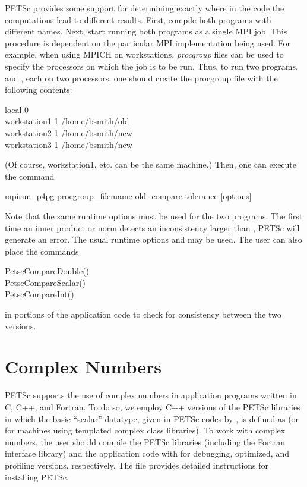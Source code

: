 {{{PETSc provides some support for determining exactly where in the code
the computations lead to different results. First, compile both programs
with different names.  Next, start running
both programs as a single MPI job. This procedure is dependent on the particular
MPI implementation being used.
For example, when using MPICH on workstations, 
{\em procgroup} files can be used to specify the processors on which the job is
to be run.  Thus, to run two programs,  and ,
each on two processors, one should create the procgroup file with the
following contents:
\begin{tabbing}
   local 0\\
   workstation1 1 /home/bsmith/old\\
   workstation2 1 /home/bsmith/new\\
   workstation3 1 /home/bsmith/new\\
\end{tabbing}
(Of course, workstation1, etc. can be the same machine.) Then, one can
execute the command
\begin{tabbing}
   mpirun -p4pg \trl{<}procgroup\_filemame\trl{>} old -compare \trl{<}tolerance\trl{>} [options]
\end{tabbing}
Note that the same runtime options must be used for the two programs.
The first time an inner product or norm detects an inconsistency larger
than , PETSc will generate an error. The usual runtime
options  and  may 
be used.   The user can also place the commands 
\begin{tabbing}
   PetscCompareDouble()\\
   PetscCompareScalar()\\
   PetscCompareInt()
\end{tabbing}
  
in portions of the application code to check for consistency between
the two versions.
 
\section{Complex Numbers}  \label{sec_complex}

PETSc supports the use of complex numbers in application programs
written in C, C++, and Fortran.  To do so, we employ C++ versions of
the PETSc libraries in which the basic ``scalar'' datatype, given in
PETSc codes by , is defined as  (or  for machines using templated complex class
libraries).  To work with complex numbers,
the user should compile the PETSc libraries (including the Fortran
interface library) and the application code with
 for debugging, optimized,
and profiling versions, respectively.  The file 
provides detailed instructions for installing PETSc.


}}}
